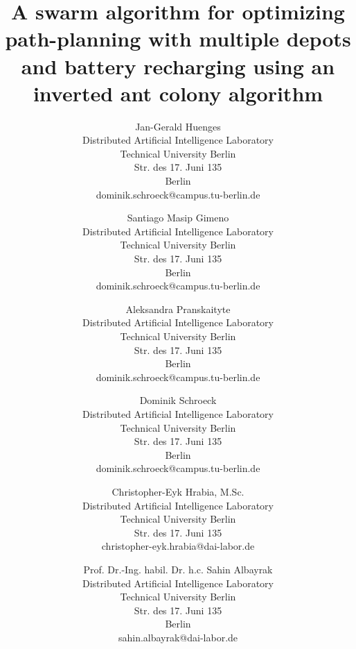 \documentclass{scspaperproc}
\theoremstyle{scsthe}
\begin{document}
\title{A swarm algorithm for optimizing path-planning with multiple depots and battery recharging using an inverted ant colony algorithm}

\author{Jan-Gerald Huenges \\[12pt]
Distributed Artificial Intelligence Laboratory \\
Technical University Berlin \\
Str. des 17. Juni 135 \\
Berlin \\
dominik.schroeck@campus.tu-berlin.de \\
\and
Santiago Masip Gimeno \\ [12pt]
Distributed Artificial Intelligence Laboratory \\
Technical University Berlin \\
Str. des 17. Juni 135 \\
Berlin \\
dominik.schroeck@campus.tu-berlin.de \\
\and
Aleksandra Pranskaityte \\ [12pt]
Distributed Artificial Intelligence Laboratory \\
Technical University Berlin \\
Str. des 17. Juni 135 \\
Berlin \\
dominik.schroeck@campus.tu-berlin.de \\
\and
Dominik Schroeck \\ [12pt]
Distributed Artificial Intelligence Laboratory \\
Technical University Berlin \\
Str. des 17. Juni 135 \\
Berlin \\
dominik.schroeck@campus.tu-berlin.de \\
\and
Christopher-Eyk Hrabia, M.Sc. \\ [12pt]
Distributed Artificial Intelligence Laboratory \\
Technical University Berlin \\
Str. des 17. Juni 135 \\
christopher-eyk.hrabia@dai-labor.de \\
\and
Prof. Dr.-Ing. habil. Dr. h.c. Sahin Albayrak\\[12pt]
Distributed Artificial Intelligence Laboratory \\
Technical University Berlin \\
Str. des 17. Juni 135 \\
Berlin \\
sahin.albayrak@dai-labor.de
}
\maketitle
\end{document}
